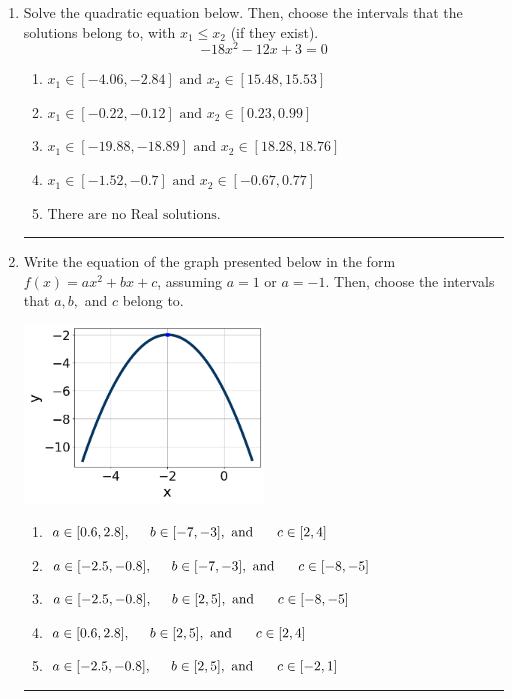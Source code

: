\documentclass[14pt]{extbook}
\newcommand{\litem}[1]{\item#1\hspace*{-1cm}\rule{\textwidth}{0.4pt}}
\begin{document}
\begin{enumerate}
{\begin{enumerate}[label=\Alph*.]
\end{enumerate} }
\litem{
Solve the quadratic equation below. Then, choose the intervals that the solutions belong to, with $x_1 \leq x_2$ (if they exist).\[ -18x^{2} -12 x + 3 = 0 \]\begin{enumerate}[label=\Alph*.]
\item \( x_1 \in [-4.06, -2.84] \text{ and } x_2 \in [15.48, 15.53] \)
\item \( x_1 \in [-0.22, -0.12] \text{ and } x_2 \in [0.23, 0.99] \)
\item \( x_1 \in [-19.88, -18.89] \text{ and } x_2 \in [18.28, 18.76] \)
\item \( x_1 \in [-1.52, -0.7] \text{ and } x_2 \in [-0.67, 0.77] \)
\item \( \text{There are no Real solutions.} \)

\end{enumerate} }
\litem{
Write the equation of the graph presented below in the form $f(x)=ax^2+bx+c$, assuming  $a=1$ or $a=-1$. Then, choose the intervals that $a, b,$ and $c$ belong to.
\begin{center}
    \includegraphics[width=0.5\textwidth]{../Figures/quadraticGraphToEquationB.png}
\end{center}
\begin{enumerate}[label=\Alph*.]
\item \( a \in [0.6, 2.8], \hspace*{5mm} b \in [-7, -3], \text{ and } \hspace*{5mm} c \in [2, 4] \)
\item \( a \in [-2.5, -0.8], \hspace*{5mm} b \in [-7, -3], \text{ and } \hspace*{5mm} c \in [-8, -5] \)
\item \( a \in [-2.5, -0.8], \hspace*{5mm} b \in [2, 5], \text{ and } \hspace*{5mm} c \in [-8, -5] \)
\item \( a \in [0.6, 2.8], \hspace*{5mm} b \in [2, 5], \text{ and } \hspace*{5mm} c \in [2, 4] \)
\item \( a \in [-2.5, -0.8], \hspace*{5mm} b \in [2, 5], \text{ and } \hspace*{5mm} c \in [-2, 1] \)


\end{enumerate}}
\end{enumerate}
\end{document}
